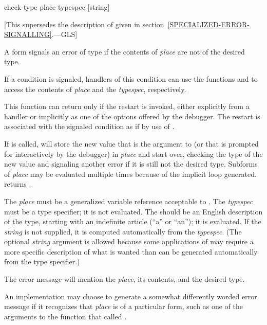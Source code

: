 \begin{defmac}
check-type place typespec [string]

   [This supersedes the description of 
   given in section~\ref{SPECIALIZED-ERROR-SIGNALLING}.---GLS]

  A  form signals an error of type
   if the contents of \emph{place} are not of the
  desired type.

  If a condition is signaled, handlers of this condition can use the
  functions  and  to access the
  contents of \emph{place} and the \emph{typespec}, respectively.

  This function can return only if the  restart is invoked, either
  explicitly from a handler or implicitly as one of the options offered by the
  debugger.
The restart is associated with the signaled condition as if by
use of .

  If  is called,  will store the new value that is
  the argument to  (or that is prompted for interactively by
  the debugger) in \emph{place} and start over, checking the type of the new value
  and signaling another error if it is still not the desired type. Subforms
  of \emph{place} may be evaluated multiple times because of the implicit loop
  generated.  returns .

  The \emph{place} must be a generalized variable reference acceptable to . The
  \emph{typespec} must be a type specifier; it is not evaluated.  The  should
  be an English description of the type, starting with an indefinite article
  (``a'' or ``an''); it is evaluated. If the \emph{string} is not supplied, it is computed
  automatically from the \emph{typespec}. (The optional \emph{string} argument is allowed 
  because some applications of  may require a more specific
  description of what is wanted than can be generated automatically from the
  type specifier.)

  The error message will mention the \emph{place}, its contents, and the desired type.

  \beforenoterule
  \begin{implementation}
  An implementation may choose to generate a somewhat
  differently worded error message if it recognizes that \emph{place} is of a
  particular form, such as one of the arguments to the function that called
  .
  \end{implementation}
\afternoterule


\end{defmac}
